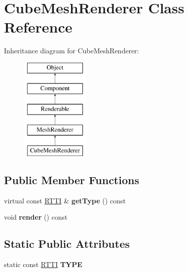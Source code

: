 \hypertarget{class_cube_mesh_renderer}{
\section{CubeMeshRenderer Class Reference}
\label{class_cube_mesh_renderer}
}
Inheritance diagram for CubeMeshRenderer:\begin{figure}[H]
\begin{center}
\leavevmode
\includegraphics[height=5.000000cm]{class_cube_mesh_renderer}
\end{center}
\end{figure}
\subsection*{Public Member Functions}
\begin{DoxyCompactItemize}
\item 
\hypertarget{class_cube_mesh_renderer_a70a84151a1571740c56c4ec07a2d45b6}{
virtual const \hyperlink{class_r_t_t_i}{RTTI} \& {\bfseries getType} () const }
\label{class_cube_mesh_renderer_a70a84151a1571740c56c4ec07a2d45b6}

\item 
\hypertarget{class_cube_mesh_renderer_a637b63af1c3e8dfb8522750c406643dd}{
void {\bfseries render} () const }
\label{class_cube_mesh_renderer_a637b63af1c3e8dfb8522750c406643dd}

\end{DoxyCompactItemize}
\subsection*{Static Public Attributes}
\begin{DoxyCompactItemize}
\item 
\hypertarget{class_cube_mesh_renderer_ad25041de79d485752808bd7cd9b26a49}{
static const \hyperlink{class_r_t_t_i}{RTTI} {\bfseries TYPE}}
\label{class_cube_mesh_renderer_ad25041de79d485752808bd7cd9b26a49}

\end{DoxyCompactItemize}
